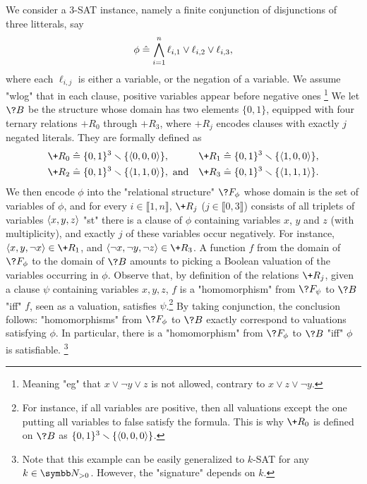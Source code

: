 \begin{example}
	\AP\label{ex:sat-as-hom}
	We consider a 3-SAT instance, namely a finite conjunction of
	disjunctions of three litterals, say
	\[
		\phi \mathrel{\hat{=}} \bigwedge_{i=1}^n \ell_{i,1} \lor \ell_{i,2} \lor \ell_{i,3},
	\]
	where each $\ell_{i,j}$ is either a variable, or the negation of a variable.
	We assume "wlog" that in each clause, positive variables appear before negative ones%
	\footnote{Meaning "eg" that $x \lor \neg y \lor z$ is not allowed, contrary to
	$x \lor z \lor \neg y$.}
	We let $\?B$ be the structure whose domain has two elements $\{0,1\}$,
	equipped with four ternary relations $+R_0$ through $+R_3$, where $+R_j$ encodes clauses with exactly $j$ negated literals. They are formally defined as
	\begin{align*}
		\+R_0 & \defeq \set{0,1}^3 \smallsetminus \set{\tup{0,0,0}}, &
		\+R_1 & \defeq \set{0,1}^3 \smallsetminus \set{\tup{1,0,0}}, \\
		\+R_2 & \defeq \set{0,1}^3 \smallsetminus \set{\tup{1,1,0}}, \text{ and} &
		\+R_3 & \defeq \set{0,1}^3 \smallsetminus \set{\tup{1,1,1}}.
	\end{align*}
	We then encode $\phi$ into the "relational structure" $\?F_\phi$
	whose domain is the set of variables of $\phi$,
	and for every $i \in \lBrack 1,n \rBrack$,
	$\+R_j$ ($j\in\lBrack 0,3\rBrack$) consists of all triplets of variables $\langle x,y,z\rangle$
	"st" there is a clause of $\phi$ containing variables $x$, $y$ and $z$ (with multiplicity), and exactly $j$ of these variables occur negatively.
	For instance, $\tup{x, y, \neg x} \in \+R_1$, and $\tup{\neg x, \neg y, \neg z} \in \+R_3$.
	A function $f$ from the domain of $\?F_\phi$ to the domain of $\?B$ amounts to picking
	a Boolean valuation of the variables occurring in $\phi$.
	Observe that, by definition of the relations $\+R_j$,
	given a clause $\psi$ containing variables $x,y,z$, 
	$f$ is a "homomorphism" from $\?F_\psi$ to $\?B$ "iff"
	$f$, seen as a valuation, satisfies $\psi$.\footnote{For instance,
	if all variables are positive, then all valuations except the one putting
	all variables to false satisfy the formula. This is why $\+R_0$ is defined
	on $\?B$ as $\{0,1\}^3\smallsetminus \{\langle0,0,0\rangle\}$.}
	By taking conjunction, the conclusion follows: "homomorphisms" from
	$\?F_\phi$ to $\?B$ exactly correspond to valuations satisfying $\phi$.
	In particular, there is a "homomorphism" from $\?F_\phi$ to $\?B$ "iff"
	$\phi$ is satisfiable.%
	\footnote{Note that this example can be easily generalized to $k$-SAT for any $k\in\Np$.
	However, the "signature" depends on $k$.}
\end{example}


